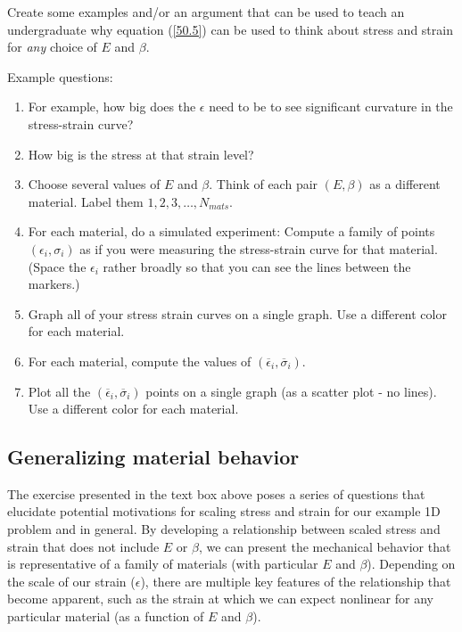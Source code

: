 \documentclass[12pt,american]{article}
\def \ep{\epsilon}
\def \barsig{\mbox{{$\overline\sigma$}}}
\def \barep{\mbox{{$\overline{\ep}$}}}
\begin{document}
\begin{tcolorbox}[title= Exercise]{
		Create some examples and/or an argument that can be used 
		to teach an undergraduate why equation (\ref{50.5}) 
		can be used to think about stress and strain for {\em any} 
		choice of $E$ and $\beta$.  
		
		Example questions: 
		\begin{enumerate}
			\item For example, how big does the $\ep$ need to be to see 
		significant curvature in the stress-strain curve?  
			\item How big is the stress at that strain level?  
			\item Choose several values of $E$ and $\beta$. Think of each
				pair $(E,\beta)$ as a different material.  Label them $1, 2, 3, \ldots, N_{mats}$.  
			\item For each material, do a simulated experiment:  Compute a family of points $(\ep_i, \sigma_i)$ as if you were measuring the stress-strain curve for that material.  (Space the $\ep_i$ rather broadly so that you can see the lines between the markers.)
			\item Graph all of your stress strain curves on a single graph. Use a different color for each material. 
			\item For each material, compute the values of $(\barep_i, \barsig_i)$.   
			\item Plot all the $(\barep_i,\barsig_i)$ points on a single graph (as a scatter plot - no lines).  Use a different color for each material.  
		\end{enumerate}
		}
\end{tcolorbox}

\subsection{Generalizing material behavior}

The exercise presented in the text box above poses a series of questions that elucidate potential motivations for scaling  stress and strain for our example 1D problem and in general. By developing a relationship between scaled stress and strain that does not include $E$ or $\beta$, we can present the mechanical behavior that is representative of a family of materials (with particular $E$ and $\beta$). Depending on the scale of our strain ($\epsilon$), there are multiple key features of the relationship that become apparent, such as the strain at which we can expect nonlinear for any particular material (as a function of $E$ and $\beta$). 
\end{document}
